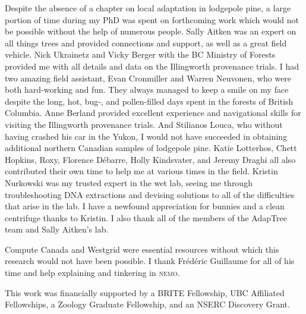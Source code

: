 Despite the absence of a chapter on local adaptation in lodgepole pine, a large portion of time during my PhD was spent on forthcoming work which would not be possible without the help of numerous people. Sally Aitken was an expert on all things trees and provided connections and support, as well as a great field vehicle. Nick Ukrainetz and Vicky Berger with the BC Ministry of Forests provided me with all details and data on the Illingworth provenance trials. I had two amazing field assistant, Evan Cronmiller and Warren Neuvonen, who were both hard-working and fun. They always managed to keep a smile on my face despite the long, hot, bug-, and pollen-filled days spent in the forests of British Columbia. Anne Berland provided excellent experience and navigational skills for visiting the Illingworth provenance trials. And Stilianos Louca, who without having crashed his car in the Yukon, I would not have succeeded in obtaining additional northern Canadian samples of lodgepole pine. Katie Lotterhos, Chett Hopkins, Roxy, Florence D\'ebarre, Holly Kindsvater, and Jeremy Draghi all also contributed their own time to help me at various times in the field. Kristin Nurkowski was my trusted expert in the wet lab, seeing me through troubleshooting DNA extractions and devising solutions to all of the difficulties that arise in the lab. I have a newfound appreciation for bunnies and a clean centrifuge thanks to Kristin. I also thank all of the members of the AdapTree team and Sally Aitken's lab.

Compute Canada and Westgrid were essential resources without which this research would not have been possible. I thank Fr\'ed\'eric Guillaume for all of his time and help explaining and tinkering in \textsc{nemo}.

This work was financially supported by a BRITE Fellowship, UBC Affiliated Fellowships, a Zoology Graduate Fellowship, and an NSERC Discovery Grant. 

